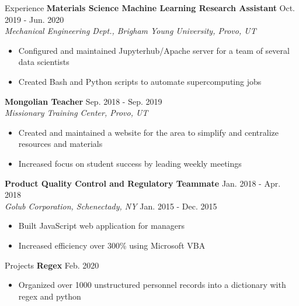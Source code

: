 \documentclass{resume} %
\begin{document}
\begin{rSection}{Experience}
\textbf{Materials Science Machine Learning Research Assistant} \hfill{Oct. 2019
- Jun. 2020}\\
\textit{Mechanical Engineering Dept., Brigham Young University, Provo, UT}
    \begin{itemize}
        \item Configured and maintained Jupyterhub/Apache server for a team of
            several data scientists
        \item Created Bash and Python scripts to automate supercomputing jobs
    \end{itemize}
\textbf{Mongolian Teacher} \hfill {Sep. 2018 - Sep. 2019}\\
\textit{Missionary Training Center, Provo, UT} 
    \begin{itemize}
        \item Created and maintained a website for the area to simplify and
            centralize resources and materials
        \item Increased focus on student success by leading weekly meetings
    \end{itemize}
\textbf{Product Quality Control and Regulatory Teammate}    \hfill {Jan. 2018 -
Apr. 2018}\\
\textit{Golub Corporation, Schenectady, NY}                 \hfill {Jan. 2015 -
Dec. 2015}  
    \begin{itemize}
        \item Built JavaScript web application for managers 
        \item Increased efficiency over 300\% using Microsoft VBA
    \end{itemize}
\end{rSection}

\begin{rSection}{Projects}
\textbf{Regex} \hfill{Feb. 2020}
    \begin{itemize}
        \item Organized over 1000 unstructured personnel records into a
            dictionary with regex and python
    \end{itemize}
\end{rSection}

\end{document}
